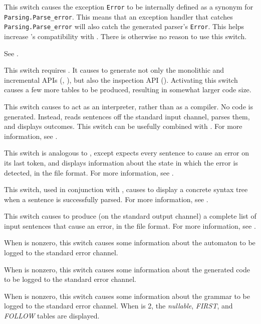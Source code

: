 \documentclass[onecolumn,11pt,nocopyrightspace,preprint]{sigplanconf}
\begin{document}
\docswitch{\ofixedexc} This switch causes the exception \texttt{Error} to be
internally defined as a synonym for \texttt{Parsing.Parse\_error}. This means
that an exception handler that catches \texttt{Parsing.Parse\_error} will also
catch the generated parser's \texttt{Error}. This helps increase \menhir's
compatibility with \ocamlyacc. There is otherwise no reason to use this switch.

\docswitch{\oinfer, \oinferwrite, \oinferread} See .

\docswitch{\oinspection} This switch requires \otable. It causes \menhir to generate
not only the monolithic and incremental APIs (,
), but also the inspection API ().
Activating this switch causes a few more tables to be produced, resulting in
somewhat larger code size.

\docswitch{\ointerpret} This switch causes \menhir to act as an interpreter,
rather than as a compiler. No \ocaml code is generated. Instead, \menhir
reads sentences off the standard input channel, parses them, and displays
outcomes. This switch can be usefully combined with \otrace.
For more information, see .

\docswitch{\ointerpreterror} This switch is analogous to \ointerpret, except
\menhir expects every sentence to cause an error on its last token, and
displays information about the state in which the error is detected, in
the \messages file format. For more information, see .

\docswitch{\ointerpretshowcst} This switch, used in conjunction with \ointerpret,
causes \menhir to display a concrete syntax tree when a sentence is successfully
parsed. For more information, see .

\docswitch{\olisterrors} This switch causes \menhir to produce (on the standard
output channel) a complete list of input sentences that cause an error, in the
\messages file format. For more information, see .

 When  is nonzero, this switch
causes some information about the automaton to be logged to the standard error
channel.

 When  is nonzero, this switch
causes some information about the generated \ocaml code to be logged to the
standard error channel.

 When  is nonzero, this switch
causes some information about the grammar to be logged to the standard error
channel. When  is 2, the \emph{nullable}, \emph{FIRST}, and
\emph{FOLLOW} tables are displayed.
\end{document}
